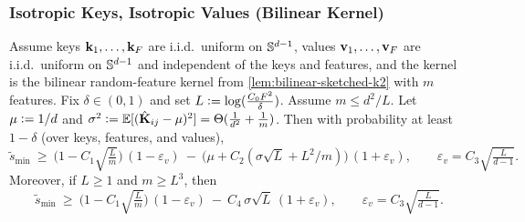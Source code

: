 \subsubsection{Isotropic Keys, Isotropic Values (Bilinear Kernel)}
\begin{theorem}
\label{app:signal-isokeys-isovalues}
Assume keys ${\mathbf{k}}_{1},\dots,{\mathbf{k}}_{F}$ are i.i.d.\ uniform on $\mathbb{S}^{d-1}$, values ${\mathbf{v}}_{1},\dots,{\mathbf{v}}_{F}$ are i.i.d.\ uniform on $\mathbb{S}^{d-1}$ and independent of the keys and features, and the kernel is the bilinear random-feature kernel from \cref{lem:bilinear-sketched-k2} with $m$ features.
Fix $\delta\in(0,1)$ and set $L\vcentcolon= \log(\tfrac{C_{0} F^2}{\delta})$.
Assume $m\le d^2/L$.
Let $\mu\vcentcolon= 1/d$ and $\sigma^2\vcentcolon= \mathbb{E}[(\hat{\mathbf{K}}_{ij}-\mu)^2]=\Theta(\tfrac{1}{d^2}+\tfrac{1}{m})$.
Then with probability at least $1-\delta$ (over keys, features, and values),
\[
\widetilde{s}_{\min}
\ \ge\
\Big(1-C_{1}\sqrt{\tfrac{L}{m}}\Big)\,(1-\varepsilon_{v})
\ -\
\Big(\mu+C_{2}(\sigma\sqrt{L}+L^2/m)\Big)\,(1+\varepsilon_{v}),
\qquad
\varepsilon_{v}=C_{3}\sqrt{\tfrac{L}{d-1}}.
\]
Moreover, if \(L\ge 1\) and $m \geq L^3$, then
\[
\widetilde{s}_{\min}
\ \ge\
\Big(1-C_{1}\sqrt{\tfrac{L}{m}}\Big)\,(1-\varepsilon_{v})
\ -\
C_{4}\,\sigma\sqrt{L}\,(1+\varepsilon_{v}),
\qquad
\varepsilon_{v}=C_{3}\sqrt{\tfrac{L}{d-1}}.
\]
\end{theorem}

